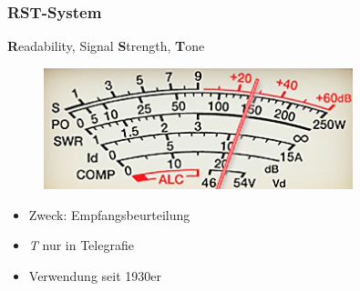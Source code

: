 \begin{frame}
  \frametitle{RST-System}

  \textbf{R}eadability, Signal \textbf{S}trength, \textbf{T}one

  \begin{center}
    \begin{figure}
      \includegraphics[width=0.8\textwidth,height=.45\textheight,keepaspectratio]{e10/S-Meter.jpg}
    \end{figure}
  \end{center}

  \begin{itemize}
    \item Zweck: Empfangsbeurteilung
    \item \emph{T} nur in Telegrafie
    \item Verwendung seit 1930er
  \end{itemize}

\end{frame}

